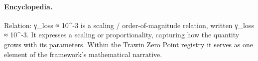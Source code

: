 \paragraph{Encyclopedia.}
Relation: γ\_loss ≈ 10\textasciicircum{}-3 is a scaling / order-of-magnitude relation, written γ\_loss ≈ 10\textasciicircum{}-3. It expresses a scaling or proportionality, capturing how the quantity grows with its parameters. Within the Trawin Zero Point registry it serves as one element of the framework's mathematical narrative.
